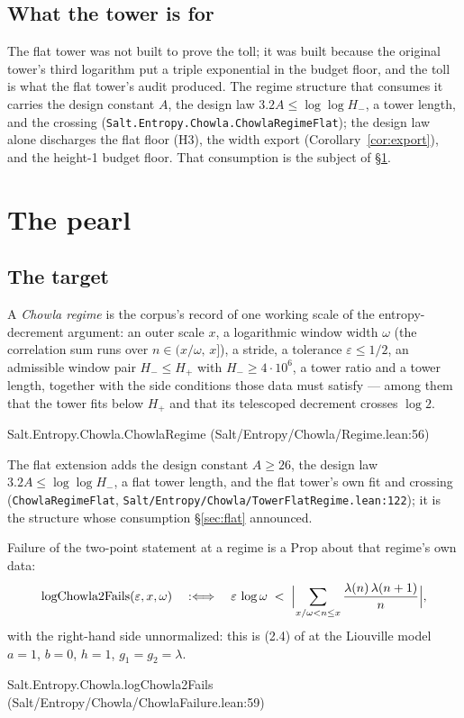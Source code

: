 \documentclass[11pt]{amsart}
\newcommand{\leanname}[1]{\par{\noindent\small\ttfamily\raggedright #1\par}}
\newcommand{\leaninline}[1]{{\small\texttt{#1}}}
\theoremstyle{remark}
\begin{document}
\subsection{What the tower is for}
The flat tower was not built to prove the toll; it was built because the
original tower's third logarithm put a triple exponential in the budget
floor, and the toll is what the flat tower's audit produced. The regime
structure that consumes it carries the design constant $A$, the design law
$3.2A \le \log\log H_-$, a tower length, and the crossing
(\leaninline{Salt.Entropy.Chowla.ChowlaRegimeFlat}); the design law alone
discharges the flat floor (H3), the width export
(Corollary~\ref{cor:export}), and the height-1 budget floor. That
consumption is the subject of \S\ref{sec:pearl}.

\section{The pearl}\label{sec:pearl}

\subsection{The target}
A \emph{Chowla regime} is the corpus's record of one working scale of the
entropy-decrement argument: an outer scale $x$, a logarithmic window width
$\omega$ (the correlation sum runs over $n \in (x/\omega,\,x]$), a stride, a
tolerance $\varepsilon \le 1/2$, an admissible window pair $H_- \le H_+$ with
$H_- \ge 4\cdot10^{6}$, a tower ratio and a tower length, together with the
side conditions those data must satisfy --- among them that the tower fits
below $H_+$ and that its telescoped decrement crosses $\log 2$.
\leanname{Salt.Entropy.Chowla.\allowbreak ChowlaRegime (Salt/\allowbreak Entropy/\allowbreak Chowla/\allowbreak Regime.lean:56)}
The flat extension adds the design constant $A \ge 26$, the design law
$3.2A \le \log\log H_-$, a flat tower length, and the flat tower's own fit and
crossing (\leaninline{ChowlaRegimeFlat},
\texttt{Salt/\allowbreak Entropy/\allowbreak Chowla/\allowbreak TowerFlatRegime.lean:122}); it is the structure
whose consumption \S\ref{sec:flat} announced.

Failure of the two-point statement at a regime is a Prop about that regime's
own data:
\begin{equation}\label{eq:fails}
\mathrm{logChowla2Fails}(\varepsilon, x, \omega)
\quad:\Longleftrightarrow\quad
\varepsilon\,\log\omega \;<\;
\Bigl|\sum_{x/\omega < n \le x} \frac{\lambda(n)\,\lambda(n+1)}{n}\Bigr| ,
\end{equation}
with the right-hand side unnormalized: this is (2.4) of \cite{TaoChowla} at the
Liouville model $a=1$, $b=0$, $h=1$, $g_1 = g_2 = \lambda$.
\leanname{Salt.Entropy.Chowla.logChowla2Fails
(Salt/Entropy/Chowla/ChowlaFailure.lean:59)}
\end{document}
